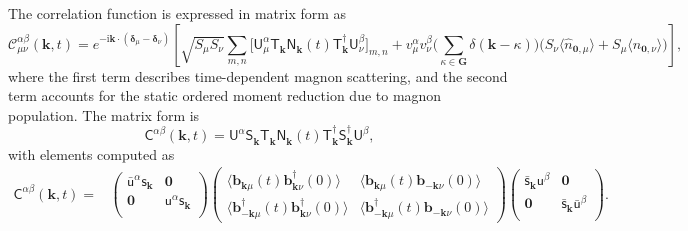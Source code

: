 \documentclass[aps, prx, nofootinbib, superscriptaddress]{revtex4-2}
\newcommand{\kvec}{\mathbf{k}}
\newcommand{\ri}{\mathrm{i}}
\begin{document}
The correlation function is expressed in matrix form as
\begin{equation}
    \mathcal{C}^{\alpha\beta}_{\mu\nu} (\kvec, t)
    = e^{ - \ri \kvec \cdot (\mathbf{\delta}_{\mu} - \mathbf{\delta}_{\nu})}  
    \left[
    \sqrt{S_{\mu}S_{\nu}} \sum_{m,n}
    \Big[ \mathsf{U}^{\alpha}_{\mu}
    \mathsf{T}_{\kvec}^{\phantom\dagger} \mathsf{N}_{\kvec}^{\phantom\dagger} (t) \mathsf{T}_{\kvec}^{\dagger}
    \mathsf{U}^{\beta}_{\nu} \Big]_{m,n}
    + v_{\mu}^{\alpha} v_{\nu}^{\beta}
    \Big( \sum_{\kappa \in \mathbf{G}} \delta(\kvec - \kappa) \Big)
    \Big( S_{\nu}\langle \hat{n}_{\mathbf{0}, \mu} \rangle + S_{\mu}\langle \hat{n}_{\mathbf{0}, \nu} \rangle \Big)
    \right],
\end{equation}
where the first term describes time-dependent magnon scattering, and the second term accounts for the static ordered moment reduction due to magnon population. The matrix form is
\begin{equation}\label{eq: matrix form of spin-spin correlation matrix}
    \mathsf{C}^{\alpha\beta} (\kvec, t)
    = 
    \mathsf{U}^{\alpha} 
    \mathsf{S}_{\kvec}^{\phantom \dagger} 
    \mathsf{T}_{\kvec}^{\phantom \dagger} 
    \mathsf{N}_{\kvec}^{\phantom \dagger}  (t)
    \mathsf{T}_{\kvec}^{         \dagger}
    \mathsf{S}_{\kvec}^{         \dagger}
    \mathsf{U}^{\beta},
\end{equation}
with elements computed as
\begin{align*}
    \mathsf{C}^{\alpha\beta} (\kvec, t) = & 
    \begin{pmatrix}
        \bar{\mathsf{u}}^{\alpha} \mathsf{s}_{\kvec}  & \mathbf{0} \\
        \mathbf{0} & \mathsf{u}^{\alpha} \mathsf{s}_{\kvec} \\
    \end{pmatrix}
    \begin{pmatrix}     
        \langle \mathbf{b}_{ \kvec\mu}           (t)    \mathbf{b}_{ \kvec\nu}^{\dagger} (0)    \rangle & 
        \langle \mathbf{b}_{ \kvec\mu}           (t)    \mathbf{b}_{-\kvec\nu}           (0)    \rangle \\
        \langle \mathbf{b}_{-\kvec\mu}^{\dagger} (t)    \mathbf{b}_{ \kvec\nu}^{\dagger} (0)    \rangle & 
        \langle \mathbf{b}_{-\kvec\mu}^{\dagger} (t)    \mathbf{b}_{-\kvec\nu}           (0)    \rangle
    \end{pmatrix}
    \begin{pmatrix}
        \bar{\mathsf{s}}_{\kvec} \mathsf{u}^{\beta} & \mathbf{0} \\
        \mathbf{0} & \bar{\mathsf{s}}_{\kvec} \bar{\mathsf{u}}^{\beta} \\
    \end{pmatrix}.
\end{align*}
\end{document}
